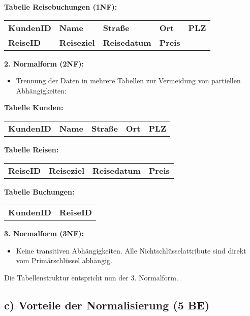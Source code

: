 \documentclass{article}
\begin{document}
	\textbf{Tabelle Reisebuchungen (1NF):}
	
	\begin{tabular}{@{}lllll@{}}
		\textbf{KundenID} & \textbf{Name} & \textbf{Straße} & \textbf{Ort} & \textbf{PLZ} \\
		\textbf{ReiseID} & \textbf{Reiseziel} & \textbf{Reisedatum} & \textbf{Preis} \\
	\end{tabular}
	
	\vspace{1em}
	
	\textbf{2. Normalform (2NF):}
	\begin{itemize}
		\item Trennung der Daten in mehrere Tabellen zur Vermeidung von partiellen Abhängigkeiten:
	\end{itemize}
	
	\textbf{Tabelle Kunden:}
	
	\begin{tabular}{@{}lllll@{}}
		\textbf{KundenID} & \textbf{Name} & \textbf{Straße} & \textbf{Ort} & \textbf{PLZ}
	\end{tabular}
	
	\vspace{0.5em}
	
	\textbf{Tabelle Reisen:}
	
	\begin{tabular}{@{}llll@{}}
		\textbf{ReiseID} & \textbf{Reiseziel} & \textbf{Reisedatum} & \textbf{Preis}
	\end{tabular}
	
	\vspace{0.5em}
	
	\textbf{Tabelle Buchungen:}
	
	\begin{tabular}{@{}ll@{}}
		\textbf{KundenID} & \textbf{ReiseID}
	\end{tabular}
	
	\vspace{1em}
	
	\textbf{3. Normalform (3NF):}
	\begin{itemize}
		\item Keine transitiven Abhängigkeiten. Alle Nichtschlüsselattribute sind direkt vom Primärschlüssel abhängig.
	\end{itemize}
	
	Die Tabellenstruktur entspricht nun der 3. Normalform.
	
	\subsection*{c) Vorteile der Normalisierung (5 BE)}
	
\end{document}
